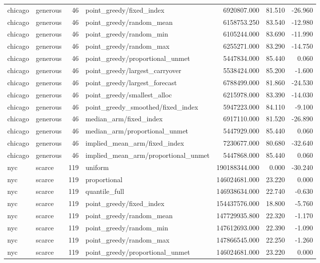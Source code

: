 \begin{tabular}{llrlrrr}
chicago & generous & 46 & point\_greedy/fixed\_index & 6920807.000 & 81.510 & -26.960 \\
chicago & generous & 46 & point\_greedy/random\_mean & 6158753.250 & 83.540 & -12.980 \\
chicago & generous & 46 & point\_greedy/random\_min & 6105244.000 & 83.690 & -11.990 \\
chicago & generous & 46 & point\_greedy/random\_max & 6255271.000 & 83.290 & -14.750 \\
chicago & generous & 46 & point\_greedy/proportional\_unmet & 5447834.000 & 85.440 & 0.060 \\
chicago & generous & 46 & point\_greedy/largest\_carryover & 5538424.000 & 85.200 & -1.600 \\
chicago & generous & 46 & point\_greedy/largest\_forecast & 6788499.000 & 81.860 & -24.530 \\
chicago & generous & 46 & point\_greedy/smallest\_alloc & 6215978.000 & 83.390 & -14.030 \\
chicago & generous & 46 & point\_greedy\_smoothed/fixed\_index & 5947223.000 & 84.110 & -9.100 \\
chicago & generous & 46 & median\_arm/fixed\_index & 6917110.000 & 81.520 & -26.890 \\
chicago & generous & 46 & median\_arm/proportional\_unmet & 5447929.000 & 85.440 & 0.060 \\
chicago & generous & 46 & implied\_mean\_arm/fixed\_index & 7230677.000 & 80.680 & -32.640 \\
chicago & generous & 46 & implied\_mean\_arm/proportional\_unmet & 5447868.000 & 85.440 & 0.060 \\
nyc & scarce & 119 & uniform & 190188344.000 & 0.000 & -30.240 \\
nyc & scarce & 119 & proportional & 146024681.000 & 23.220 & 0.000 \\
nyc & scarce & 119 & quantile\_full & 146938634.000 & 22.740 & -0.630 \\
nyc & scarce & 119 & point\_greedy/fixed\_index & 154437576.000 & 18.800 & -5.760 \\
nyc & scarce & 119 & point\_greedy/random\_mean & 147729935.800 & 22.320 & -1.170 \\
nyc & scarce & 119 & point\_greedy/random\_min & 147612693.000 & 22.390 & -1.090 \\
nyc & scarce & 119 & point\_greedy/random\_max & 147866545.000 & 22.250 & -1.260 \\
nyc & scarce & 119 & point\_greedy/proportional\_unmet & 146024681.000 & 23.220 & 0.000 \\

\end{tabular}
